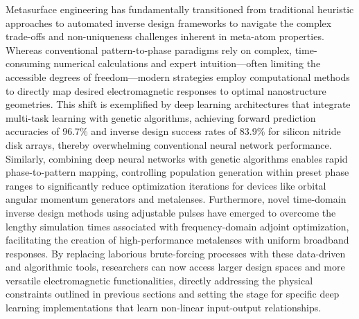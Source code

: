 \documentclass[11pt]{article}
\begin{document}
Metasurface engineering has fundamentally transitioned from traditional heuristic approaches to automated inverse design frameworks to navigate the complex trade-offs and non-uniqueness challenges inherent in meta-atom properties. Whereas conventional pattern-to-phase paradigms rely on complex, time-consuming numerical calculations and expert intuition---often limiting the accessible degrees of freedom---modern strategies employ computational methods to directly map desired electromagnetic responses to optimal nanostructure geometries. This shift is exemplified by deep learning architectures that integrate multi-task learning with genetic algorithms, achieving forward prediction accuracies of 96.7\% and inverse design success rates of 83.9\% for silicon nitride disk arrays, thereby overwhelming conventional neural network performance. Similarly, combining deep neural networks with genetic algorithms enables rapid phase-to-pattern mapping, controlling population generation within preset phase ranges to significantly reduce optimization iterations for devices like orbital angular momentum generators and metalenses. Furthermore, novel time-domain inverse design methods using adjustable pulses have emerged to overcome the lengthy simulation times associated with frequency-domain adjoint optimization, facilitating the creation of high-performance metalenses with uniform broadband responses. By replacing laborious brute-forcing processes with these data-driven and algorithmic tools, researchers can now access larger design spaces and more versatile electromagnetic functionalities, directly addressing the physical constraints outlined in previous sections and setting the stage for specific deep learning implementations that learn non-linear input-output relationships. \citep{doi_10_1016_j_rio_2026_100988_b00ee173} \citep{doi_10_1364_oe_478084_bf365dc5} \citep{doi_10_1109_apmc60911_2024_10867828_7c3f3b13}
\end{document}
